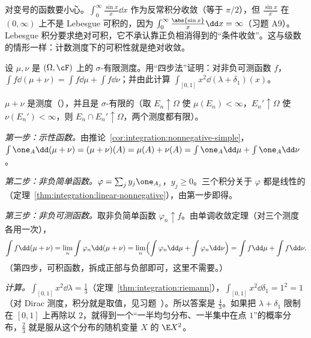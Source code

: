 对变号的函数要小心。$\int_0^\infty\frac{\sin x}x\dd x$ 作为反常积分收敛（等于 $\pi/2$），但 $\frac{\sin x}x$ 在 $(0,\infty)$ 上不是 Lebesgue 可积的，因为 $\int_0^\infty\frac{\abs{\sin x}}x\dd x=\infty$（习题 A9）。Lebesgue 积分要求绝对可积，它不承认靠正负相消得到的“条件收敛”。这与级数的情形一样：计数测度下的可积性就是绝对收敛。

\begin{workedexample}\label{we:integration:four-step}
设 $\mu,\nu$ 是 $(\Omega,\cF)$ 上的 $\sigma$-有限测度。用“四步法”证明：对非负可测函数 $f$，$\int f\dd(\mu+\nu)=\int f\dd\mu+\int f\dd\nu$；并由此计算 $\int_{[0,1]}x^2\dd(\lambda+\delta_1)(x)$。
\end{workedexample}
\begin{solution}
$\mu+\nu$ 是测度（），并且是 $\sigma$-有限的（取 $E_n\uparrow\Omega$ 使 $\mu(E_n)<\infty$，$E_n'\uparrow\Omega$ 使 $\nu(E_n')<\infty$，则 $E_n\cap E_n'\uparrow\Omega$，两个测度都有限）。

\emph{第一步：示性函数。}由推论~\ref{cor:integration:nonnegative-simple}，$\int\one_A\dd(\mu+\nu)=(\mu+\nu)(A)=\mu(A)+\nu(A)=\int\one_A\dd\mu+\int\one_A\dd\nu$。

\emph{第二步：非负简单函数。}$\varphi=\sum_jy_j\one_{A_j}$，$y_j\geqslant0$。三个积分关于 $\varphi$ 都是线性的（定理~\ref{thm:integration:linear-nonnegative}），由第一步即得。

\emph{第三步：非负可测函数。}取非负简单函数 $\varphi_n\uparrow f$。由单调收敛定理（对三个测度各用一次），
\[
\int f\dd(\mu+\nu)=\lim_n\int\varphi_n\dd(\mu+\nu)=\lim_n\Bigl(\int\varphi_n\dd\mu+\int\varphi_n\dd\nu\Bigr)=\int f\dd\mu+\int f\dd\nu .
\]
（第四步，可积函数，拆成正部与负部即可，这里不需要。）

\emph{计算。}$\int_{[0,1]}x^2\dd\lambda=\frac13$（定理~\ref{thm:integration:riemann}），$\int_{[0,1]}x^2\dd\delta_1=1^2=1$（对 Dirac 测度，积分就是取值，见习题~）。所以答案是 $\frac43$。如果把 $\lambda+\delta_1$ 限制在 $[0,1]$ 上再除以 $2$，就得到一个“一半均匀分布、一半集中在点 $1$”的概率分布，$\frac23$ 就是服从这个分布的随机变量 $X$ 的 $\E X^2$。
\end{solution}

